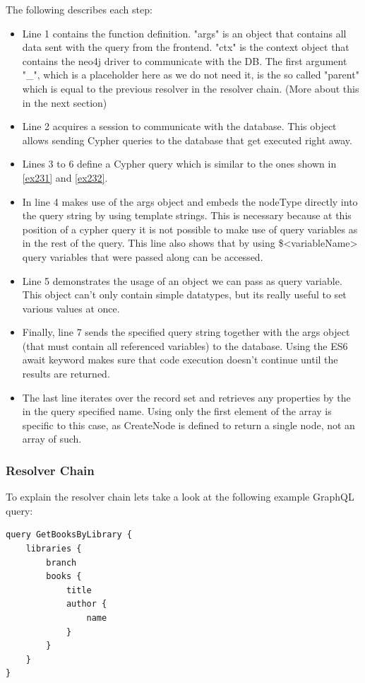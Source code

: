 The following describes each step:
\begin{itemize}
\item Line 1 contains the function definition. "args" is an object that contains all data sent with the query from the frontend. "ctx" is the context object that contains the neo4j driver to communicate with the DB. The first argument "\_", which is a placeholder here as we do not need it, is the so called "parent" which is equal to the previous resolver in the resolver chain. (More about this in the next section)
\item Line 2 acquires a session to communicate with the database. \cite{Neo4jDriver} This object allows sending Cypher queries to the database that get executed right away.
\item Lines 3 to 6 define a Cypher query which is similar to the ones shown in \autoref{ex231} and \autoref{ex232}. 
\item In line 4 makes use of the args object and embeds the nodeType directly into the query string by using template strings. This is necessary because at this position of a cypher query it is not possible to make use of query variables as in the rest of the query. This line also shows that by using \$<variableName> query variables that were passed along can be accessed.
\item Line 5 demonstrates the usage of an object we can pass as query variable. This object can't only contain simple datatypes, but its really useful to set various values at once.
\item Finally, line 7 sends the specified query string together with the args object (that must contain all referenced variables) to the database. Using the ES6 await keyword makes sure that code execution doesn't continue until the results are returned.
\item The last line iterates over the record set and retrieves any properties by the in the query specified name. Using only the first element of the array is specific to this case, as CreateNode is defined to return a single node, not an array of such.
\end{itemize}

\subsubsection{Resolver Chain}
To explain the resolver chain lets take a look at the following example GraphQL query: \citep[with adaptions]{ApolloResChain}
\lstset{language=GraphQL}
\begin{lstlisting}[label={ex242},caption={GraphQL query to fetch all books with their title and author name of all libraries}]
query GetBooksByLibrary {
	libraries { 
		branch 
		books { 
			title 
			author { 
				name 
			} 
		} 
	} 
}
\end{lstlisting}

